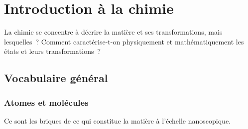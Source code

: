 \documentclass[../main/main.tex]{subfiles}
\begin{document}
\setcounter{chapter}{0}

\chapter{Introduction \`a la chimie}

La chimie se concentre à décrire la matière et ses transformations, mais
lesquelles~? Comment caractérise-t-on physiquement et mathématiquement les états
et leurs transformations~?

\section{Vocabulaire général}
\subsection{Atomes et molécules}
Ce sont les briques de ce qui constitue la matière à l'échelle nanoscopique.
\end{document}
